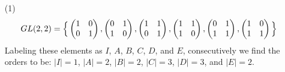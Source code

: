 \begin{example}\label{example_1.10}
  \begin{enumerate}
    \item[(1)]
      \begin{equation*}
        GL(2,2)=\Big{\{}
          \begin{pmatrix}
            1   &   0   \\
            0   &   1   \\
          \end{pmatrix},
          \begin{pmatrix}
            0   &   1   \\
            1   &   0   \\
          \end{pmatrix},
          \begin{pmatrix}
            1   &   1   \\
            0   &   1   \\
          \end{pmatrix},
          \begin{pmatrix}
            1   &   1   \\
            1   &   0   \\
          \end{pmatrix},
          \begin{pmatrix}
            0   &   1   \\
            1   &   1   \\
          \end{pmatrix},
          \begin{pmatrix}
            1   &   0   \\
            1   &   1   \\
          \end{pmatrix}
        \Big{\}}
      \end{equation*}
      Labeling these elements as $I$,  $A$,  $B$,  $C$,  $D$, and  $E$,
      consecutively we find the orders to be:  $|I|=1$, $|A|=2$,
      $|B|=2$, $|C|=3$, $|D|=3$, and $|E|=2$.


\end{enumerate}
\end{example}
